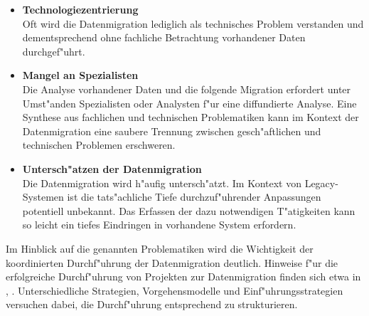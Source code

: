 \begin{itemize}
	\item \textbf{Technologiezentrierung} \\
			Oft wird die Datenmigration lediglich als technisches Problem verstanden \citep[S.~9]{morris-2012} und dementsprechend ohne fachliche Betrachtung vorhandener Daten durchgef"uhrt.
	\item \textbf{Mangel an Spezialisten} \\
			Die Analyse vorhandener Daten und die folgende Migration erfordert unter Umst"anden Spezialisten oder Analysten f"ur eine diffundierte Analyse. Eine Synthese aus fachlichen und technischen Problematiken kann im Kontext der Datenmigration eine saubere Trennung zwischen gesch"aftlichen und technischen Problemen erschweren.
	\item \textbf{Untersch"atzen der Datenmigration} \\
			Die Datenmigration wird h"aufig untersch"atzt. Im Kontext von Legacy-Systemen ist die tats"achliche Tiefe durchzuf"uhrender Anpassungen potentiell unbekannt. Das Erfassen der dazu notwendigen T"atigkeiten kann so leicht ein tiefes Eindringen in vorhandene System erfordern.
\end{itemize}

Im Hinblick auf die genannten Problematiken wird die Wichtigkeit der koordinierten Durchf"uhrung der Datenmigration deutlich. Hinweise f"ur die erfolgreiche Durchf"uhrung von Projekten zur Datenmigration finden sich etwa in \citep{sas-2009}, \citep{oracle-2011}. Unterschiedliche Strategien, Vorgehensmodelle und Einf"uhrungsstrategien versuchen dabei, die Durchf"uhrung entsprechend zu strukturieren. 